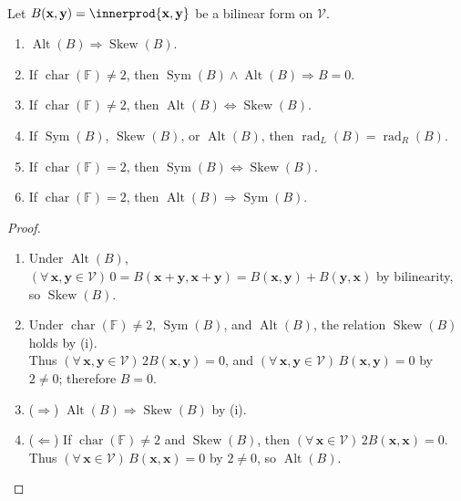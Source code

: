 \begin{proposition} \label{prop:form-type-relations-by-characteristic} \\
Let $B(\mathbf{x},\mathbf{y})=\innerprod{\mathbf{x},\mathbf{y}}$ be a bilinear form on $\mathcal{V}$.
\begin{enumerate}[label=(\roman*)]
\setlength{\itemsep}{0pt}
\item $\operatorname{Alt}(B)\Rightarrow\operatorname{Skew}(B)$.
\item If $\operatorname{char}(\mathbb{F})\neq2$, then $\operatorname{Sym}(B)\wedge\operatorname{Alt}(B)\Rightarrow B=0$.
\item If $\operatorname{char}(\mathbb{F})\neq2$, then $\operatorname{Alt}(B)\Longleftrightarrow\operatorname{Skew}(B)$.
\item If $\operatorname{Sym}(B)$, $\operatorname{Skew}(B)$, or $\operatorname{Alt}(B)$, then $\operatorname{rad}_{L}(B)=\operatorname{rad}_{R}(B)$.
\item If $\operatorname{char}(\mathbb{F})=2$, then $\operatorname{Sym}(B)\Longleftrightarrow\operatorname{Skew}(B)$.
\item If $\operatorname{char}(\mathbb{F})=2$, then $\operatorname{Alt}(B)\Rightarrow\operatorname{Sym}(B)$.
\end{enumerate}
\begin{proof}
\begin{enumerate}[label=(\roman*)]
\setlength{\itemsep}{0pt}
\item[$(i)$] Under $\operatorname{Alt}(B)$, $(\forall\,\mathbf{x},\mathbf{y}\in\mathcal{V})\,0=B(\mathbf{x}+\mathbf{y},\mathbf{x}+\mathbf{y})=B(\mathbf{x},\mathbf{y})+B(\mathbf{y},\mathbf{x})$ by bilinearity, so $\operatorname{Skew}(B)$.
\item[$(ii)$] Under $\operatorname{char}(\mathbb{F})\neq2$, $\operatorname{Sym}(B)$, and $\operatorname{Alt}(B)$, the relation $\operatorname{Skew}(B)$ holds by (i).\\
Thus $(\forall\,\mathbf{x},\mathbf{y}\in\mathcal{V})\,2B(\mathbf{x},\mathbf{y})=0$, and $(\forall\,\mathbf{x},\mathbf{y}\in\mathcal{V})\,B(\mathbf{x},\mathbf{y})=0$ by $2\neq0$; therefore $B=0$.
\item[$(iii)$] ($\Rightarrow$) $\operatorname{Alt}(B)\Rightarrow\operatorname{Skew}(B)$ by (i).
\item[$(iii)$] ($\Leftarrow$) If $\operatorname{char}(\mathbb{F})\neq2$ and $\operatorname{Skew}(B)$, then $(\forall\,\mathbf{x}\in\mathcal{V})\,2B(\mathbf{x},\mathbf{x})=0$. Thus $(\forall\,\mathbf{x}\in\mathcal{V})\,B(\mathbf{x},\mathbf{x})=0$ by $2\neq0$, so $\operatorname{Alt}(B)$.

\end{enumerate}
\end{proof}
\end{proposition}
